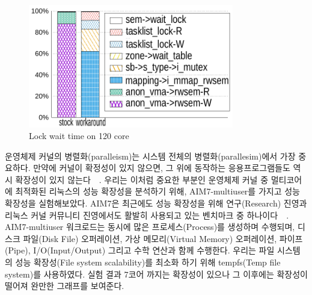 \begin{figure}[h]
    \centering
    \includegraphics[width=0.8\textwidth]{graph/lockstat}
    \caption{Lock wait time on 120 core}
  \label{fig:aim7_default}
\end{figure}



운영체제 커널의 병렬화(paralleism)는 시스템 전체의 병렬화(parallesim)에서 가장 중요하다. 
만약에 커널이 확정성이 있지 않으면, 그 위에 동작하는 응용프로그램들도 역시 확장성이 있지
 않는다~\cite{Clements15SCR}~\cite{Boyd-WickizerCorey}.
우리는 이처럼 중요한 부분인 운영체제 커널 중 멀티코어에 최적화된 리눅스의 성능 확장성을 분석하기 위해, 
AIM7-multiuser를 가지고 성능 확장성을 실험해보았다.
AIM7은 최근에도 성능 확장성을 위해 연구(Research) 진영과 리눅스 커널 커뮤니티 진영에서도 활발히
 사용되고 있는 벤치마크 중 하나이다~\cite{Bueso2015STP}~\cite{Bueso2014MCS}.
AIM7-multiuser 워크로드는 동시에 많은 프로세스(Process)를 생성하며 수행되며, 디스크 파일(Disk File) 오퍼레이션,
 가상 메모리(Virtual Memory) 오퍼레이션, 파이프(Pipe), I/O(Input/Output) 그리고 수학 연산과 함께 수행한다.
우리는 파일 시스템의 성능 확장성(File system scalability)를 최소화 하기 위해 
tempfs(Temp file system)를 사용하였다.
실험 결과 7코어 까지는 확장성이 있으나 그 이후에는 확장성이 떨어져 완만한 그래프를 보여준다. 


